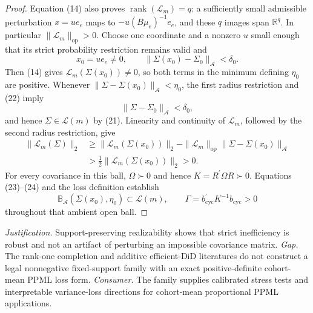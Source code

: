 \documentclass{article}
\begin{document}
\begin{proof}
Equation (14) also proves \(\operatorname{rank}(\mathcal L_m)=q\): a sufficiently small admissible perturbation \(x=ue_e\) maps to
\(-u(B\mu_e)^{-1}e_e\), and these \(q\) images span \(\mathbb R^q\).  In particular \(\|\mathcal L_m\|_{\mathrm{op}}>0\).  Choose one coordinate and a nonzero \(u\) small enough that its strict probability restriction remains valid and
\[
x_0=ue_e\ne0,
\qquad
\|\Sigma(x_0)-\Sigma_0\|_{\mathcal A}<\delta_0.                        \tag{22}
\]
Then (14) gives \(\mathcal L_m(\Sigma(x_0))\ne0\), so both terms in the minimum defining \(\eta_0\) are positive.  Whenever
\(\|\Sigma-\Sigma(x_0)\|_{\mathcal A}<\eta_0\), the first radius restriction and (22) imply
\[
\|\Sigma-\Sigma_0\|_{\mathcal A}<\delta_0,                            \tag{23}
\]
and hence \(\Sigma\in\mathcal L(m)\) by (21).  Linearity and continuity of \(\mathcal L_m\), followed by the second radius restriction, give
\[
\begin{aligned}
\|\mathcal L_m(\Sigma)\|_2
&\ge \|\mathcal L_m(\Sigma(x_0))\|_2
-\|\mathcal L_m\|_{\mathrm{op}}
 \|\Sigma-\Sigma(x_0)\|_{\mathcal A}\\
&>\tfrac12\|\mathcal L_m(\Sigma(x_0))\|_2>0.                          \tag{24}
\end{aligned}
\]
For every covariance in this ball, \(\Omega\succ0\) and hence
\(K=R^{\prime}\Omega R\succ0\).  Equations (23)--(24) and the loss definition establish
\[
\mathbb B_{\mathcal A}(\Sigma(x_0),\eta_0)\subset\mathcal L(m),
\qquad
\Gamma=b_{\mathrm{cyc}}^{\prime}K^{-1}b_{\mathrm{cyc}}>0
\]
throughout that ambient open ball.
\end{proof}
\par\smallskip\noindent \textit{Justification.} Support-preserving realizability shows that strict inefficiency is robust and not an artifact of perturbing an impossible covariance matrix. \textit{Gap.} The rank-one completion and additive efficient-DiD literatures do not construct a legal nonnegative fixed-support family with an exact positive-definite cohort-mean PPML loss form. \textit{Consumer.} The family supplies calibrated stress tests and interpretable variance-loss directions for cohort-mean proportional PPML applications.
\end{document}
